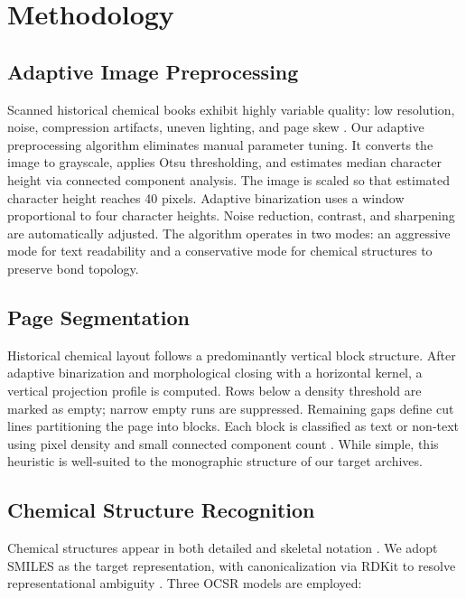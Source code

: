 \documentclass[conference]{IEEEtran}
\begin{document}
\section{Methodology}

\subsection{Adaptive Image Preprocessing}

Scanned historical chemical books exhibit highly variable quality: low resolution, noise, compression artifacts, uneven lighting, and page skew \cite{ref16}. Our adaptive preprocessing algorithm eliminates manual parameter tuning. It converts the image to grayscale, applies Otsu thresholding, and estimates median character height via connected component analysis. The image is scaled so that estimated character height reaches 40 pixels. Adaptive binarization uses a window proportional to four character heights. Noise reduction, contrast, and sharpening are automatically adjusted. The algorithm operates in two modes: an aggressive mode for text readability and a conservative mode for chemical structures to preserve bond topology.

\subsection{Page Segmentation}

Historical chemical layout follows a predominantly vertical block structure. After adaptive binarization and morphological closing with a horizontal kernel, a vertical projection profile is computed. Rows below a density threshold are marked as empty; narrow empty runs are suppressed. Remaining gaps define cut lines partitioning the page into blocks. Each block is classified as text or non-text using pixel density and small connected component count \cite{ref5}. While simple, this heuristic is well-suited to the monographic structure of our target archives.

\subsection{Chemical Structure Recognition}

Chemical structures appear in both detailed and skeletal notation \cite{ref17,ref18}. We adopt SMILES \cite{ref19} as the target representation, with canonicalization via RDKit to resolve representational ambiguity \cite{ref20,ref21}. Three OCSR models are employed:
\end{document}
